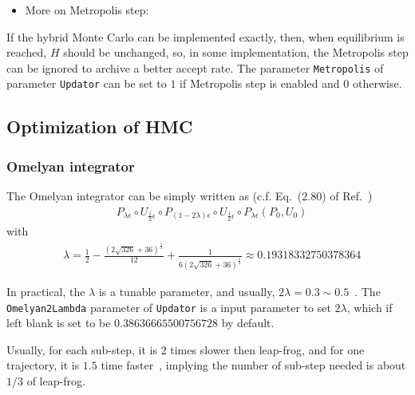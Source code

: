 \begin{itemize}
 \item More on Metropolis step:
\end{itemize}

If the hybrid Monte Carlo can be implemented exactly, then, when equilibrium is reached, $H$ should be unchanged, so, in some implementation, the Metropolis step can be ignored to archive a better accept rate. The parameter \verb"Metropolis" of parameter \verb"Updator" can be set to $1$ if Metropolis step is enabled and $0$ otherwise.

\subsection{\label{sec:optimized_hmc}Optimization of HMC}

\subsubsection{\label{sec:Omelyan}Omelyan integrator}

The Omelyan integrator can be simply written as (c.f. Eq.~(2.80) of Ref.~\cite{latticeqcdbook2017})
\begin{equation}
\begin{split}
&P_{\lambda\epsilon}\circ U_{\frac{1}{2}\epsilon}\circ P_{(1-2\lambda)\epsilon}\circ U_{\frac{1}{2}\epsilon}\circ P_{\lambda\epsilon}\left(P_0,U_0\right)
\end{split}
\label{eq.hmc.update_Omelyan}
\end{equation}
with
\begin{equation}
\begin{split}
&\lambda = \frac{1}{2}-\frac{\left(2\sqrt{326}+36\right)^{\frac{1}{3}}}{12}+\frac{1}{6\left(2\sqrt{326}+36\right)^{\frac{1}{3}}}\approx 0.19318332750378364
\end{split}
\label{eq.hmc.update_Omelyan2}
\end{equation}

In practical, the $\lambda$ is a tunable parameter, and usually, $2\lambda = 0.3 \sim 0.5$~\cite{latticeqcdreview2009}. The \verb"Omelyan2Lambda" parameter of \verb"Updator" is a input parameter to set $2\lambda$, which if left blank is set to be $0.38636665500756728$ by default.

Usually, for each sub-step, it is $2$ times slower then leap-frog, and for one trajectory, it is $1.5$ time faster~\cite{latticeqcdreview2009}, implying the number of sub-step needed is about $1/3$ of leap-frog.

